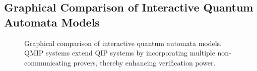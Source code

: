 \subsection*{Graphical Comparison of Interactive Quantum Automata Models}
\begin{figure}[ht]
\centering
{}
\caption{Graphical comparison of interactive quantum automata models. QMIP systems extend QIP systems by incorporating multiple non-communicating provers, thereby enhancing verification power.}
\label{fig:interactive-hierarchy}
\end{figure}
